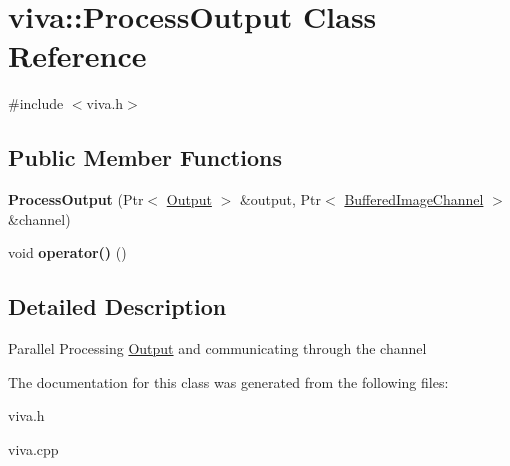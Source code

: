 \hypertarget{classviva_1_1_process_output}{}\section{viva\+:\+:Process\+Output Class Reference}
\label{classviva_1_1_process_output}


{\ttfamily \#include $<$viva.\+h$>$}

\subsection*{Public Member Functions}
\begin{DoxyCompactItemize}
\item 
{\bfseries Process\+Output} (Ptr$<$ \hyperlink{classviva_1_1_output}{Output} $>$ \&output, Ptr$<$ \hyperlink{classviva_1_1_buffered_channel}{Buffered\+Image\+Channel} $>$ \&channel)\hypertarget{classviva_1_1_process_output_aa4a2cb166b42b1fa0cad620c0b5d7dd4}{}\label{classviva_1_1_process_output_aa4a2cb166b42b1fa0cad620c0b5d7dd4}

\item 
void {\bfseries operator()} ()\hypertarget{classviva_1_1_process_output_a1ff45ccbb3854063c62ca9fb098f0ea2}{}\label{classviva_1_1_process_output_a1ff45ccbb3854063c62ca9fb098f0ea2}

\end{DoxyCompactItemize}


\subsection{Detailed Description}
Parallel Processing \hyperlink{classviva_1_1_output}{Output} and communicating through the channel 

The documentation for this class was generated from the following files\+:\begin{DoxyCompactItemize}
\item 
viva.\+h\item 
viva.\+cpp\end{DoxyCompactItemize}

